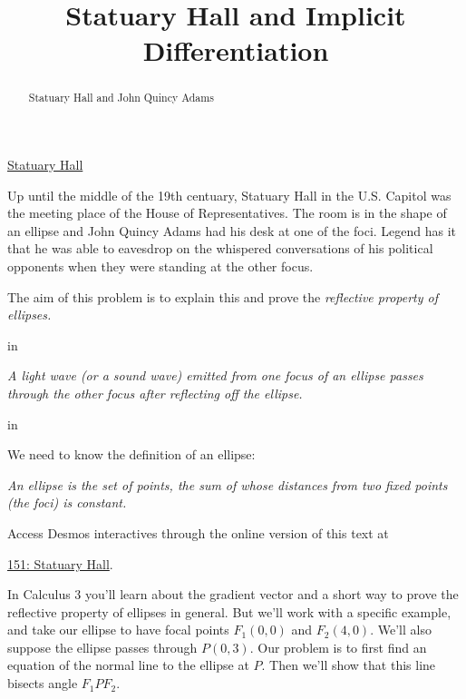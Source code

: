 \documentclass{ximera}
\title{Statuary Hall and Implicit Differentiation}
\newcommand{\pskip}{\vskip 0.1 in}
\begin{document}
\begin{abstract}
Statuary Hall and John Quincy Adams
\end{abstract}
\maketitle


\begin{question}  \label{Q656g5y4546}

\begin{center}
\end{center}

\href{https://www.youtube.com/watch?v=FX6rUU_74kk}{Statuary Hall}


Up until the middle of the 19th centuary, Statuary Hall in the U.S. Capitol was the meeting place of the House of Representatives. The room is in the shape of an ellipse and John Quincy Adams had his desk at one of the foci. Legend has it that he was able to eavesdrop on the whispered conversations of his political opponents when they were standing at the other focus.

The aim of this problem is to explain this and prove the \emph{reflective property of ellipses.}

\pskip

\emph{A light wave (or a sound wave) emitted from one focus of an ellipse passes through the other focus after reflecting off the ellipse.}

\pskip

We need to know the definition of an ellipse:

\emph{An ellipse is the set of points, the sum of whose distances from two fixed points (the foci) is constant.} 

\begin{onlineOnly}
    \begin{center}
\end{center}
\end{onlineOnly}

Access Desmos interactives through the online version of this text at
 
\href{https://https://www.desmos.com/calculator/6kxtojk72r}{151: Statuary Hall}.

In Calculus 3 you'll learn about the gradient vector and a short way to prove the reflective property of ellipses in general. But we'll work with a specific example, and take our ellipse to have focal points $F_1(0,0)$ and $F_2(4,0)$. We'll also suppose the ellipse passes through $P(0,3)$. Our problem is to first find an equation of the normal line to the ellipse at $P$. Then we'll show that this line bisects angle $F_1PF_2$. 


\end{question}
\end{document}
